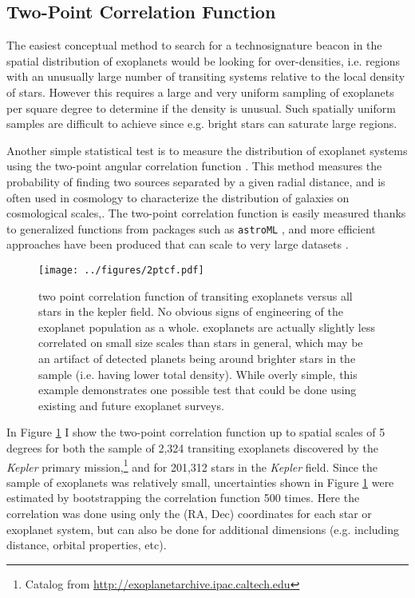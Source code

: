 \documentclass[twocolumn]{aastex62}
\newcommand{\Kepler}{\textsl{Kepler}\xspace}
\begin{document}
\subsection{Two-Point Correlation Function}
\label{sec:2pt}

The easiest conceptual method to search for a technosignature beacon in the spatial distribution of exoplanets would be looking for over-densities, i.e. regions with an unusually large number of transiting systems relative to the local density of stars. However this requires a large and very uniform sampling of exoplanets per square degree to determine if the density is unusual. Such spatially uniform samples are difficult to achieve since e.g. bright stars can saturate large regions.


Another simple statistical test is to measure the distribution of exoplanet systems using the two-point angular correlation function \citep{landy1993}. This method measures the probability of finding two sources separated by a given radial distance, and is often used in cosmology to characterize the distribution of galaxies on cosmological scales,. The two-point correlation function is easily measured thanks to generalized functions from packages such as {\tt astroML} \citep{astroMLText}, and  more efficient approaches have been produced that can scale to very large datasets \citep[e.g.][]{wang2013}.


\begin{figure}[!t]
\centering
\texttt{[image: ../figures/2ptcf.pdf]}
\caption{two point correlation function of transiting exoplanets versus all stars in the kepler field. No obvious signs of engineering of the exoplanet population as a whole. exoplanets are actually slightly less correlated on small size scales than stars in general, which may be an artifact of detected planets being around brighter stars in the sample (i.e. having lower total density). 
While overly simple, this example demonstrates one possible test that could be done using existing and future exoplanet surveys.}
\label{fig:2pt}
\end{figure}



In Figure \ref{fig:2pt} I show the two-point correlation function up to spatial scales of 5 degrees for both the sample of 2,324 transiting exoplanets discovered by the \Kepler primary mission,\footnote{Catalog from \url{http://exoplanetarchive.ipac.caltech.edu}} and for 201,312 stars in the \Kepler field. Since the sample of exoplanets was relatively small, uncertainties shown in Figure \ref{fig:2pt} were estimated by bootstrapping the correlation function 500 times. Here the correlation was done using only the (RA, Dec) coordinates for each star or exoplanet system, but can also be done for additional dimensions (e.g. including distance, orbital properties, etc).
\end{document}
